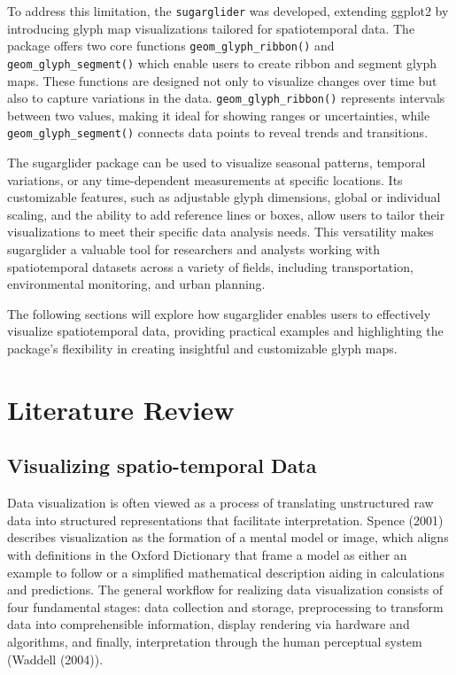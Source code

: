 To address this limitation, the \texttt{sugarglider} was developed, extending ggplot2 by introducing glyph map visualizations tailored for spatiotemporal data. The package offers two core functions \texttt{geom\_glyph\_ribbon()} and \texttt{geom\_glyph\_segment()} which enable users to create ribbon and segment glyph maps. These functions are designed not only to visualize changes over time but also to capture variations in the data. \texttt{geom\_glyph\_ribbon()} represents intervals between two values, making it ideal for showing ranges or uncertainties, while \texttt{geom\_glyph\_segment()} connects data points to reveal trends and transitions.

The sugarglider package can be used to visualize seasonal patterns, temporal variations, or any time-dependent measurements at specific locations. Its customizable features, such as adjustable glyph dimensions, global or individual scaling, and the ability to add reference lines or boxes, allow users to tailor their visualizations to meet their specific data analysis needs. This versatility makes sugarglider a valuable tool for researchers and analysts working with spatiotemporal datasets across a variety of fields, including transportation, environmental monitoring, and urban planning.

The following sections will explore how sugarglider enables users to effectively visualize spatiotemporal data, providing practical examples and highlighting the package's flexibility in creating insightful and customizable glyph maps.

\section{Literature Review}\label{literature-review}

\subsection{Visualizing spatio-temporal Data}\label{visualizing-spatio-temporal-data}

Data visualization is often viewed as a process of translating unstructured raw data into structured representations that facilitate interpretation. Spence (2001) describes visualization as the formation of a mental model or image, which aligns with definitions in the Oxford Dictionary that frame a model as either an example to follow or a simplified mathematical description aiding in calculations and predictions. The general workflow for realizing data visualization consists of four fundamental stages: data collection and storage, preprocessing to transform data into comprehensible information, display rendering via hardware and algorithms, and finally, interpretation through the human perceptual system (Waddell (2004)).

